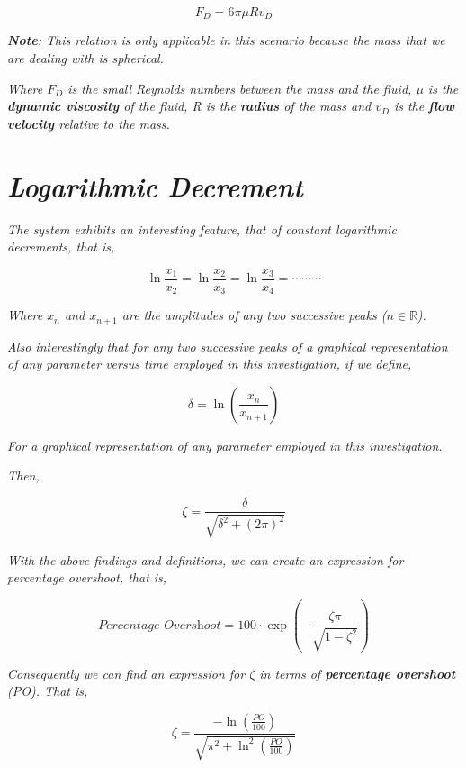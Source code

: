        $$F_D = 6\pi\mu Rv_D$$
            
    \textit{\textbf{Note}: This relation is only applicable in this scenario because the mass that we are dealing with is spherical.}
            
    \textit{Where $F_D$ is the small Reynolds numbers between the mass and the fluid, $\mu$ is the \textbf{dynamic viscosity} of the fluid, R is the \textbf{radius} of the mass and $v_D$ is the \textbf{flow velocity} relative to the mass.}
            
\section{\textit{Logarithmic Decrement}}
            
    \textit{The system exhibits an interesting feature, that of constant logarithmic decrements, that is,}
            
        $$\ln{\frac{x_1}{x_2}} = \ln{\frac{x_2}{x_3}} = \ln{\frac{x_3}{x_4}} = \cdots\cdots\cdots$$
            
    \textit{Where $x_n$ and $x_{n + 1}$ are the amplitudes of any two successive peaks ($n \in \mathbb{R}$).}
            
    \textit{Also interestingly that for any two successive peaks of a graphical representation of any parameter versus time employed in this investigation, if we define,}
            
        $$\delta = \ln{\left(\frac{x_n}{x_{n + 1}}\right)}$$
            
    \textit{For a graphical representation of any parameter employed in this investigation.}
            
    \textit{Then,}
            
        $$\zeta = \frac{\delta}{\sqrt{\delta^2 + \left(2\pi\right)^2}}$$
            
    \textit{With the above findings and definitions, we can create an expression for percentage overshoot, that is,}
            
        $$\textit{Percentage Overshoot} = 100\cdot\exp{\left(-\frac{\zeta\pi}{\sqrt{1 - \zeta^2}}\right)}$$
            
    \textit{Consequently we can find an expression for $\zeta$ in terms of \textbf{percentage overshoot} (PO). That is,}
            
        $$\zeta = \frac{-\ln{\left(\frac{PO}{100}\right)}}{\sqrt{\pi^2 + \ln^2{\left(\frac{PO}{100}\right)}}}$$
            
